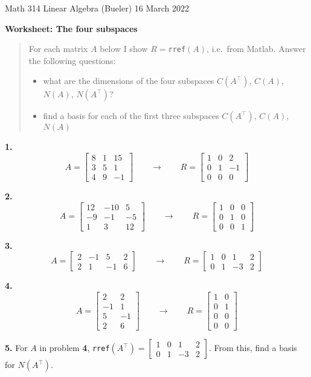 \documentclass[12pt]{amsart}
\newcommand{\prob}[1]{\bigskip\noindent\textbf{#1.}\quad }
\newcommand{\ds}{\displaystyle}
\begin{document}
\scriptsize \noindent Math 314 Linear Algebra (Bueler) \hfill 16 March 2022 
\normalsize\medskip

\Large\centerline{\textbf{Worksheet: The four subspaces}}
\medskip
\normalsize

\thispagestyle{empty}
\begin{quote}
For each matrix $A$ below I show $R=$\texttt{rref}$(A)$, i.e.~from Matlab.  Answer the following questions:

\medskip
\begin{itemize}
\item what are the dimensions of the four subspaces $C(A^\top)$, $C(A)$, $N(A)$, $N(A^\top)$?
\item find a basis for each of the first three subspaces $C(A^\top)$, $C(A)$, $N(A)$
\end{itemize}
\end{quote}

\prob{1}
    $$A = \begin{bmatrix} 8 & 1 & 15 \\ 3 & 5 & 1 \\ 4 & 9 & -1 \end{bmatrix} \qquad \to \qquad R = \begin{bmatrix} 1 & 0 & 2 \\ 0 & 1 & -1 \\ 0 & 0 & 0 \end{bmatrix}$$
\vfill

\prob{2}
    $$A = \begin{bmatrix} 12 & -10 & 5 \\ -9 & -1 & -5 \\ 1 & 3 & 12 \end{bmatrix} \qquad \to \qquad R = \begin{bmatrix} 1 & 0 & 0 \\ 0 & 1 & 0 \\ 0 & 0 & 1 \end{bmatrix}$$
\vfill

\clearpage \newpage
\prob{3}
    $$A = \begin{bmatrix} 2 & -1 & 5 & 2 \\ 2 & 1 & -1 & 6 \end{bmatrix} \qquad \to \qquad R = \begin{bmatrix} 1 & 0 & 1 & 2 \\ 0 & 1 & -3 & 2 \end{bmatrix}$$
\vfill

\prob{4}
    $$A = \begin{bmatrix} 2 & 2 \\ -1 & 1 \\ 5 & -1 \\ 2 & 6 \end{bmatrix} \qquad \to \qquad R = \begin{bmatrix} 1 & 0 \\ 0 & 1 \\ 0 & 0 \\ 0 & 0 \end{bmatrix}$$
\vfill

\prob{5} For $A$ in problem \textbf{4}, \texttt{rref}$\ds (A^\top)= \begin{bmatrix}
1 & 0 & 1 & 2 \\ 0 & 1 & -3 & 2 \end{bmatrix}$.  From this, find a basis for $N(A^\top)$.
\vfill
\end{document}
